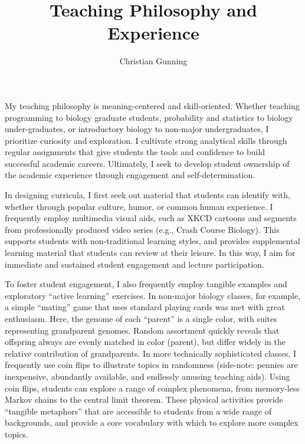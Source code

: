 \documentclass[12pt]{article}
\author{Christian Gunning}
\title{Teaching Philosophy and Experience}
\begin{document}
\maketitle
\thispagestyle{empty}
\linespread{1.25}\selectfont

My teaching philosophy is meaning-centered and skill-oriented.  Whether teaching
programming to biology graduate students, probability and statistics to biology
under-graduates, or introductory biology to non-major undergraduates, I
prioritize curiosity and exploration.  I cultivate strong analytical skills
through regular assignments that give students the tools and confidence to build
successful academic careers. Ultimately, I seek to develop student ownership of
the academic experience through engagement and self-determination.

In designing curricula, I first seek out material that students can identify with,
whether through popular culture, humor, or common human experience.  I
frequently employ multimedia visual aids, such as XKCD cartoons and segments
from professionally produced video series (e.g., Crash Course Biology).  This
supports students with non-traditional learning styles, and provides
supplemental learning material that students can review at their leisure. In
this way, I aim for immediate and sustained student engagement and lecture 
participation.

To foster student engagement, I also frequently employ
 tangible examples and exploratory ``active learning'' exercises.
In non-major biology classes, for example, a simple 
``mating'' game that uses standard playing cards was met 
with great enthusiasm.  Here, the genome of each ``parent'' 
is a single color, with suites representing grandparent genomes.
Random assortment quickly reveals that offspring always are
evenly matched in color (parent), but differ widely in the 
relative contribution of grandparents.  In more technically
sophisticated classes, I frequently use coin flips to
illustrate topics in randomness (side-note: 
pennies are inexpensive, abundantly available, and endlessly 
amusing teaching aids).
Using coin flips, students can explore a range 
of complex phenomena, from memory-less Markov chains to the 
central limit theorem.  These physical activities provide
``tangible metaphors'' that are 
accessible to students from a wide range of backgrounds, 
and provide a core vocabulary with which to explore more 
complex topics.
\end{document}
